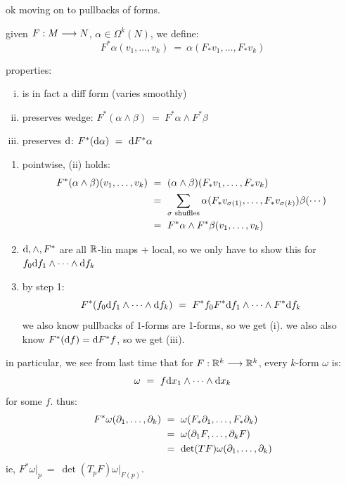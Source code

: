 ok moving on to pullbacks of forms.
\begin{defn}
	given $F:M\longrightarrow N$, $\alpha\in\Omega^{k}(N)$, we define:
	\begin{equation*}
		F^{*}\alpha(v_{1},\dots,v_{k}) \ = \ \alpha(F_{*}v_{1},\dots,F_{*}v_{k})
	\end{equation*}
\end{defn}

properties:
\begin{enumerate}[i)]
	\item is in fact a diff form (varies smoothly)
	\item preserves wedge: $F^{*}(\alpha\wedge\beta) \ = \ F^{*}\alpha\wedge F^{*}\beta$
	\item preserves $\textrm{d}$: $F^{*}(\textrm{d}\alpha) \ = \ \textrm{d} F^{*}\alpha$
\end{enumerate}

\begin{pf}\vspace{-0.2in}
	\begin{enumerate}
		\item pointwise, (ii) holds:
			\begin{align*}
				F^{*}(\alpha\wedge\beta)(v_{1},\dots,v_{k})
				& \ = \ (\alpha\wedge\beta)(F_{*}v_{1},\dots,F_{*}v_{k}) \\
				& \ = \ \sum_{\sigma \trm{ shuffles}}\alpha(F_{*}v_{\sigma(1)},\dots,F_{*}v_{\sigma(k)})\beta(\cdots) \\
				& \ = \ F^{*}\alpha\wedge F^{*}\beta(v_{1},\dots,v_{k})
			\end{align*}
		\item $\textrm{d},\wedge,F^{*}$ are all $\mathbb{R}$-lin maps + local, so
			we only have to show this for $f_{0}\textrm{d} f_{1}\wedge\cdots\wedge\textrm{d} f_{k}$
		\item by step 1:
			\begin{equation*}
				F^{*}(f_{0}\textrm{d} f_{1}\wedge\cdots\wedge\textrm{d} f_{k})
				\ = \ F^{*}f_{0}F^{*}\textrm{d} f_{1}\wedge\cdots\wedge F^{*}\textrm{d} f_{k}
			\end{equation*}
			we also know pullbacks of 1-forms are 1-forms, so we get (i).
			we also also know $F^{*}(\textrm{d} f)=\textrm{d} F^{*}f$, so we get (iii).
	\end{enumerate}
\end{pf}

in particular, we see from last time that for $F:\mathbb{R}^{k}\longrightarrow\mathbb{R}^{k}$,
every $k$-form $\omega$ is:
\begin{equation*}
	\omega \ = \ f\textrm{d} x_{1}\wedge\cdots\wedge\textrm{d} x_{k}
\end{equation*}
for some $f$. thus:
\begin{align*}
	F^{*}\omega(\partial_{1},\dots,\partial_{k})
	& \ = \ \omega(F_{*}\partial_{1},\dots,F_{*}\partial_{k}) \\
	& \ = \ \omega(\partial_{1}F,\dots,\partial_{k}F) \\
	& \ = \ \det(TF)\omega(\partial_{1},\dots,\partial_{k})
\end{align*}
ie, $F^{*}\omega\big\rvert_{p} \ = \ \det(T_{p}F)\omega\big\rvert_{F(p)}$.
